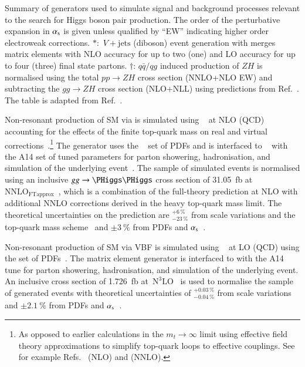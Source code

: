 \begin{sidewaystable}[p]
  \centering

  \caption{Summary of generators used to simulate signal and
    background processes relevant to the search for Higgs boson pair
    production. The order of the perturbative expansion in $\alpha_{\text{s}}$
    is given unless qualified by ``EW'' indicating higher order
    electroweak corrections. $*$:~$V+\text{jets}$ (diboson) event
    generation with \SHERPA[2.2.1] merges matrix elements with NLO
    accuracy for up to two (one) and LO accuracy for up to four
    (three) final state partons. $\dagger$: $q\bar{q} / qg$ induced
    production of $ZH$ is normalised using the total $pp \to ZH$ cross
    section (NNLO+NLO EW) and subtracting the $gg \to ZH$ cross
    section (NLO+NLL) using predictions from
    Ref.~\cite{deFlorian:2016spz}. The table is adapted from
    Ref.~\cite{ATLAS-CONF-2021-030}.}%
  \label{tab:monte_carlo}

  \resizebox{\textwidth}{!}{}
\end{sidewaystable}

Non-resonant production of SM \HH via \ggF is simulated using
\POWHEGBOX[v2]~\cite{Nason:2004rx,Frixione:2007vw,Alioli:2010xd} at NLO (QCD)
accounting for the effects of the finite top-quark mass on real and virtual
corrections~\cite{Borowka:2016ehy,Baglio:2018lrj,Heinrich:2017kxx,Heinrich:2019bkc,Heinrich:2020ckp}.\footnote{As
  opposed to earlier calculations in the $m_{t} \to \infty$ limit using
  effective field theory approximations to simplify top-quark loops to effective
  couplings. See for example Refs.~\cite{Dawson:1998py} (NLO) and
  \cite{deFlorian:2013jea} (NNLO).} The generator uses the
\PDFforLHC[15nlo]~\cite{Butterworth:2015oua} set of PDFs and is interfaced to
\PYTHIA[8]~\cite{Sjostrand:2014zea} with the A14 set of tuned parameters for
parton showering, hadronisation, and simulation of the underlying
event~\cite{ATL-PHYS-PUB-2014-021}. The sample of simulated events is normalised
using an inclusive $gg \to \HH$ cross section of \SI{31.05}{\femto\barn} at
$\text{NNLO}_{\text{FTapprox}}$~\cite{Grazzini:2018bsd}, which is a combination
of the full-theory prediction at NLO with additional NNLO corrections derived in
the heavy top-quark mass limit. The theoretical uncertainties on the prediction
are $^{+6\,\%}_{-23\,\%}$ from scale variations and the top-quark mass
scheme~\cite{Baglio:2020wgt} and $\pm\SI{3}{\percent}$ from PDFs and
$\alpha_{\text{s}}$~\cite{LHCHWGHH}.

Non-resonant production of SM \HH via VBF is simulated using
\MGNLO~\cite{Alwall:2014hca} %
at LO (QCD) %
using the \NNPDF[3.0nlo] set of PDFs~\cite{Ball:2014uwa}. The matrix
element generator is interfaced to \PYTHIA[8] with the A14 tune for
parton showering, hadronisation, and simulation of the underlying
event. An inclusive cross section of \SI{1.726}{\femto\barn}
at~$\text{N}^3\text{LO}$~\cite{Dreyer:2018qbw,LHCHWGHH} is used to
normalise the sample of generated events with theoretical
uncertainties of $^{+0.03\,\%}_{-0.04\,\%}$ from scale variations and
$\pm\SI{2.1}{\percent}$ from PDFs and $\alpha_{\text{s}}$~\cite{LHCHWGHH}.


